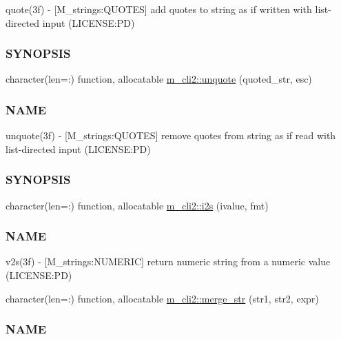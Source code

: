 \begin{DoxyCompactItemize}
\begin{DoxyCompactList}
quote(3f) -\/ \mbox{[}M\+\_\+strings\+:Q\+U\+O\+T\+ES\mbox{]} add quotes to string as if written with list-\/directed input (L\+I\+C\+E\+N\+SE\+:PD) \subsubsection*{S\+Y\+N\+O\+P\+S\+IS}\end{DoxyCompactList}\item 
character(len=\+:) function, allocatable \mbox{\hyperlink{namespacem__cli2_a9cab7352414f8b5625330a9ff5cf0cb4}{m\+\_\+cli2\+::unquote}} (quoted\+\_\+str, esc)
\begin{DoxyCompactList}\small\item\em \subsubsection*{N\+A\+ME}

unquote(3f) -\/ \mbox{[}M\+\_\+strings\+:Q\+U\+O\+T\+ES\mbox{]} remove quotes from string as if read with list-\/directed input (L\+I\+C\+E\+N\+SE\+:PD) \subsubsection*{S\+Y\+N\+O\+P\+S\+IS}\end{DoxyCompactList}\item 
character(len=\+:) function, allocatable \mbox{\hyperlink{namespacem__cli2_aa106d3533fd6d4845f0b3e94b2a79ffb}{m\+\_\+cli2\+::i2s}} (ivalue, fmt)
\begin{DoxyCompactList}\small\item\em \subsubsection*{N\+A\+ME}

v2s(3f) -\/ \mbox{[}M\+\_\+strings\+:N\+U\+M\+E\+R\+IC\mbox{]} return numeric string from a numeric value (L\+I\+C\+E\+N\+SE\+:PD) \end{DoxyCompactList}\item 
character(len=\+:) function, allocatable \mbox{\hyperlink{namespacem__cli2_a8e172feb2e4ae4d21d4fceb4e54f593c}{m\+\_\+cli2\+::merge\+\_\+str}} (str1, str2, expr)
\begin{DoxyCompactList}\small\item\em \subsubsection*{N\+A\+ME}


\end{DoxyCompactList}
\end{DoxyCompactItemize}
